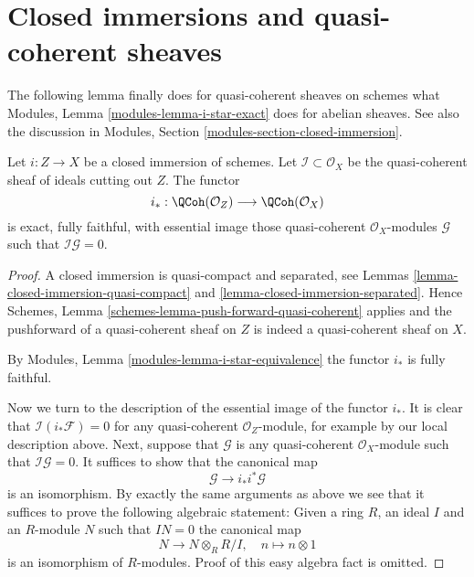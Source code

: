 \section{Closed immersions and quasi-coherent sheaves}
\label{section-closed-immersions-quasi-coherent}

\noindent
The following lemma finally does for quasi-coherent sheaves on schemes
what Modules, Lemma \ref{modules-lemma-i-star-exact} does for abelian sheaves.
See also the discussion in
Modules, Section \ref{modules-section-closed-immersion}.

\begin{lemma}
\label{lemma-i-star-equivalence}
Let $i : Z \to X$ be a closed immersion of schemes. Let
$\mathcal{I} \subset \mathcal{O}_X$ be the quasi-coherent sheaf of ideals
cutting out $Z$. The functor
$$
i_* :
\QCoh(\mathcal{O}_Z)
\longrightarrow
\QCoh(\mathcal{O}_X)
$$
is exact, fully faithful, with essential image those quasi-coherent
$\mathcal{O}_X$-modules $\mathcal{G}$ such that $\mathcal{I}\mathcal{G} = 0$.
\end{lemma}

\begin{proof}
A closed immersion is quasi-compact and separated, see
Lemmas \ref{lemma-closed-immersion-quasi-compact} and
\ref{lemma-closed-immersion-separated}. Hence
Schemes, Lemma \ref{schemes-lemma-push-forward-quasi-coherent}
applies and the pushforward of a quasi-coherent
sheaf on $Z$ is indeed a quasi-coherent sheaf on $X$.

\medskip\noindent
By Modules, Lemma \ref{modules-lemma-i-star-equivalence}
the functor $i_*$ is fully faithful.

\medskip\noindent
Now we turn to the description of the essential image of the
functor $i_*$. It is clear that $\mathcal{I}(i_*\mathcal{F}) = 0$
for any quasi-coherent $\mathcal{O}_Z$-module, for example
by our local description above. Next, suppose that $\mathcal{G}$
is any quasi-coherent $\mathcal{O}_X$-module such that
$\mathcal{I}\mathcal{G} = 0$. It suffices to show that the canonical map
$$
\mathcal{G} \longrightarrow i_* i^*\mathcal{G}
$$
is an isomorphism. By exactly the same arguments as above we see that
it suffices to prove the following algebraic statement: Given a ring
$R$, an ideal $I$ and an $R$-module $N$ such that $IN = 0$ the canonical map
$$
N \longrightarrow N \otimes_R R/I,\quad
n \longmapsto n \otimes 1
$$
is an isomorphism of $R$-modules. Proof of this easy algebra fact is omitted.
\end{proof}

